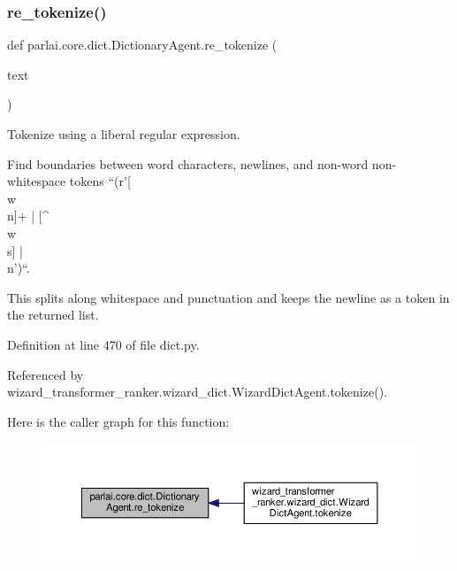 \subsubsection{\texorpdfstring{re\+\_\+tokenize()}{re\_tokenize()}}
{\footnotesize\ttfamily def parlai.\+core.\+dict.\+Dictionary\+Agent.\+re\+\_\+tokenize (\begin{DoxyParamCaption}\item[{}]{text }\end{DoxyParamCaption})\hspace{0.3cm}{\ttfamily [static]}}

\begin{DoxyVerb}Tokenize using a liberal regular expression.

Find boundaries between word characters, newlines, and non-word
non-whitespace tokens ``(r'[\\w\\n]+ | [^\\w\\s] | \\n')``.

This splits along whitespace and punctuation and keeps the newline as
a token in the returned list.
\end{DoxyVerb}
 

Definition at line 470 of file dict.\+py.



Referenced by wizard\+\_\+transformer\+\_\+ranker.\+wizard\+\_\+dict.\+Wizard\+Dict\+Agent.\+tokenize().

Here is the caller graph for this function\+:
\nopagebreak
\begin{figure}[H]
\begin{center}
\leavevmode
\includegraphics[width=350pt]{classparlai_1_1core_1_1dict_1_1DictionaryAgent_a78edf54954bf0514e1798ce694a758fe_icgraph}
\end{center}
\end{figure}
\mbox{\label{classparlai_1_1core_1_1dict_1_1DictionaryAgent_ae828063449b45112d82a97921d35c247}} 

